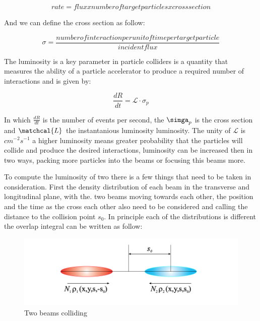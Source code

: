 \begin{equation}
rate = flux x number of target particles x cross section
\end{equation}

And we can define the cross section as follow:

\begin{equation}
\sigma = \frac{number of interaction per unit of time per target particle}{incident flux}
\end{equation}


The luminosity is a key parameter in particle colliders is a quantity that measures the ability of a particle accelerator to produce a required number of interactions and is given by: \cite{Lum} 

\begin{equation}
\frac{dR}{dt} = \mathcal{L} \cdot \sigma_{p} 
\end{equation}

In which $\frac{dR}{dt}$ is the number of events per second, the $\simga_{p}$ is the cross section and $\matchcal{L}$ the instantanious luminosity luminosity. The unity of $\mathcal{L}$ is  $cm^{-2} s^{-1}$ a higher luminosity means greater probability that the particles will collide and produce the desired interactions, luminosity can be increased then in two ways, packing more particles into the beams or focusing this beams more.  

To compute the luminosity of two there is a few things that need to be taken in consideration. First the density distribution of each beam in the transverse and longitudinal plane, with the. two beams moving towards each other, the position and the time as the cross each other also need to be considered and calling the distance to the collision point $s_{0}$. In principle each of the distributions is different the overlap integral can be written as follow:


\begin{figure}[h]
    \centering
    \includegraphics[width=1\textwidth]{lumi.png}
    \caption{Two beams colliding}
    \label{fig:beamslumi}
\end{figure}


